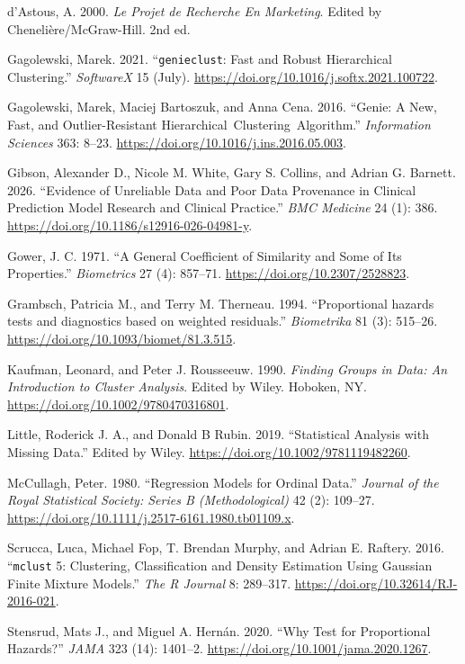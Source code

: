 \documentclass[
  11pt,
  letterpaper,
]{scrbook}
\newlength{\cslhangindent}
\newenvironment{CSLReferences}[2] %
 {\begin{list}{}{%
  \setlength{\itemindent}{0pt}
  \setlength{\leftmargin}{0pt}
  \setlength{\parsep}{0pt}
  \ifodd #1
   \setlength{\leftmargin}{\cslhangindent}
   \setlength{\itemindent}{-1\cslhangindent}
  \fi
  \setlength{\itemsep}{#2\baselineskip}}}
 {\end{list}}
\theoremstyle{definition}
\theoremstyle{remark}
\begin{document}
\label{refs}
\begin{CSLReferences}{1}{0}
d'Astous, A. 2000. \emph{Le Projet de Recherche En Marketing}. Edited by
Chenelière/McGraw-Hill. 2nd ed.

Gagolewski, Marek. 2021. {``\texttt{genieclust}: Fast and Robust
Hierarchical Clustering.''} \emph{SoftwareX} 15 (July).
\url{https://doi.org/10.1016/j.softx.2021.100722}.

Gagolewski, Marek, Maciej Bartoszuk, and Anna Cena. 2016. {``Genie: A
New, Fast, and Outlier-Resistant Hierarchical~Clustering~Algorithm.''}
\emph{Information Sciences} 363: 8--23.
\url{https://doi.org/10.1016/j.ins.2016.05.003}.

Gibson, Alexander D., Nicole M. White, Gary S. Collins, and Adrian G.
Barnett. 2026. {``Evidence of Unreliable Data and Poor Data Provenance
in Clinical Prediction Model Research and Clinical Practice.''}
\emph{BMC Medicine} 24 (1): 386.
\url{https://doi.org/10.1186/s12916-026-04981-y}.

Gower, J. C. 1971. {``A General Coefficient of Similarity and Some of
Its Properties.''} \emph{Biometrics} 27 (4): 857--71.
\url{https://doi.org/10.2307/2528823}.

Grambsch, Patricia M., and Terry M. Therneau. 1994. {``{Proportional
hazards tests and diagnostics based on weighted residuals}.''}
\emph{Biometrika} 81 (3): 515--26.
\url{https://doi.org/10.1093/biomet/81.3.515}.

Kaufman, Leonard, and Peter J. Rousseeuw. 1990. \emph{Finding Groups in
Data: An Introduction to Cluster Analysis}. Edited by Wiley. Hoboken,
NY. \url{https://doi.org/10.1002/9780470316801}.

Little, Roderick J. A., and Donald B Rubin. 2019. {``Statistical
Analysis with Missing Data.''} Edited by Wiley.
\url{https://doi.org/10.1002/9781119482260}.

McCullagh, Peter. 1980. {``Regression Models for Ordinal Data.''}
\emph{Journal of the Royal Statistical Society: Series B
(Methodological)} 42 (2): 109--27.
\url{https://doi.org/10.1111/j.2517-6161.1980.tb01109.x}.

Scrucca, Luca, Michael Fop, T. Brendan Murphy, and Adrian E. Raftery.
2016. {``\texttt{mclust} 5: Clustering, Classification and Density
Estimation Using {G}aussian Finite Mixture Models.''} \emph{The R
Journal} 8: 289--317. \url{https://doi.org/10.32614/RJ-2016-021}.

Stensrud, Mats J., and Miguel A. Hernán. 2020. {``{Why Test for
Proportional Hazards?}''} \emph{JAMA} 323 (14): 1401--2.
\url{https://doi.org/10.1001/jama.2020.1267}.

\end{CSLReferences}
\end{document}

